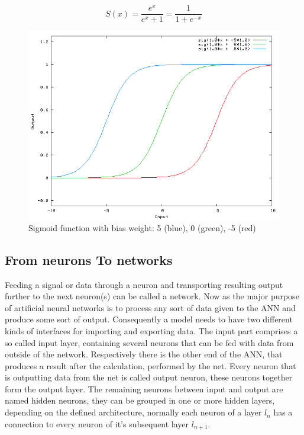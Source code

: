 \begin{equation}
	\label{eqn:sigmoid}
	S(x) = \frac{e^x}{e^x + 1} = \frac{1}{1 + e^{-x}}
\end{equation} 


\begin{figure}[H]
	\centering
	\includegraphics[width=\textwidth]{images/sigmoid.png}
	\caption{Sigmoid function with bias weight: 5 (blue), 0 (green), -5 (red){\cite{sigmoid}}}
	\label{fig:sigmoid}
	
\end{figure}


\subsection{From neurons To networks}
Feeding a signal or data through a neuron and transporting resulting output further to the next neuron(s) can be called a network. Now as the major purpose of artificial neural networks is to process any sort of data given to the ANN and produce some sort of output. Consequently a model needs to have two different kinds of interfaces for importing and exporting data. \newline
The input part comprises a so called input layer, containing several neurons that can be fed with data from outside of the network. Respectively there is the other end of the ANN, that produces a result after the calculation, performed by the net. Every neuron that is outputting data from the net is called output neuron, these neurons together form the output layer. The remaining neurons between input and output are named hidden neurons, they can be grouped in one or more hidden layers, depending on the defined architecture, normally each neuron of a layer $l_{n}$ has a connection to every neuron of it's subsequent layer $l_{n+1}$.

